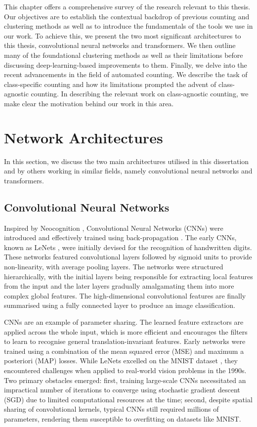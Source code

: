\documentclass[../thesis.tex]{subfiles}
\begin{document}
This chapter offers a comprehensive survey of the research relevant to this thesis. Our objectives are to establish the contextual backdrop of previous counting and clustering methods as well as to introduce the fundamentals of the tools we use in our work.
To achieve this, we present the two most significant architectures to this thesis, convolutional neural networks and transformers.
We then outline many of the foundational clustering methods as well as their limitations before discussing deep-learning-based improvements to them.
Finally, we delve into the recent advancements in the field of automated counting. We describe the task of class-specific counting and how its limitations prompted the advent of class-agnostic counting.
In describing the relevant work on class-agnostic counting, we make clear the motivation behind our work in this area.


\section{Network Architectures}
In this section, we discuss the two main architectures utilised in this dissertation and by others working in similar fields, namely convolutional neural networks and transformers.

\subsection{Convolutional Neural Networks}

Inspired by Neocognition \cite{fukushima1980neocognitron}, Convolutional Neural Networks (CNNs) were introduced and effectively trained using back-propagation \cite{lecun1989backpropagation, lecun1998gradient}. 
The early CNNs, known as LeNets \cite{lecun1989backpropagation}, were initially devised for the recognition of handwritten digits. 
These networks featured convolutional layers followed by sigmoid units to provide non-linearity, with average pooling layers. 
The networks were structured hierarchically,
with the initial layers being responsible for extracting local features from the input and the later layers gradually amalgamating them into more complex global features. 
The high-dimensional convolutional features are finally summarised using a fully connected layer to produce an image classification. 

CNNs are an example of parameter sharing. 
The learned feature extractors are applied across the whole input, which is more efficient and encourages the filters to learn to recognise general translation-invariant features.
Early networks were trained using a combination of the mean squared error (MSE) and maximum a posteriori (MAP) losses. 
While LeNets excelled on the MNIST dataset \cite{lecun1998gradient}, they encountered challenges when applied to real-world vision problems in the 1990s. 
Two primary obstacles emerged: first, training large-scale CNNs necessitated an impractical number of iterations to converge using stochastic gradient descent (SGD) due to limited computational resources at the time; second, despite spatial sharing of convolutional kernels, typical CNNs still required millions of parameters, rendering them susceptible to overfitting on datasets like MNIST.
\end{document}
